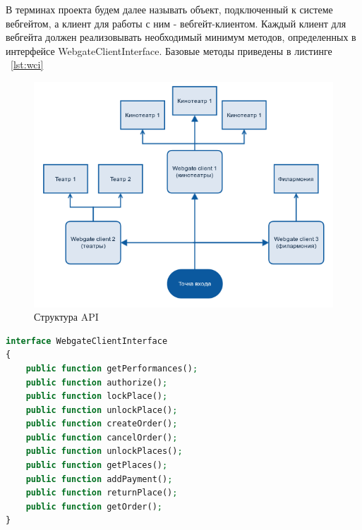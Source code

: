 В терминах проекта будем далее называть объект, подключенный к системе вебгейтом, а клиент для работы с ним - вебгейт-клиентом. Каждый клиент для вебгейта должен реализовывать необходимый минимум методов, определенных в интерфейсе WebgateClientInterface. Базовые методы приведены в листинге ~\ref{lst:wci}

\begin{figure}
  	\centering
 	\includegraphics[width=1\textwidth]{images/api-struct.png}
  	\caption{Структура API}
    \label{fig:api-struct}
\end{figure}

\begin{lstlisting}[language=PHP,caption={WebgateCleintInterface}label=lst:wci]
interface WebgateClientInterface
{
	public function getPerformances();
	public function authorize();
	public function lockPlace();
	public function unlockPlace();
	public function createOrder();
	public function cancelOrder();
	public function unlockPlaces();
	public function getPlaces();
	public function addPayment();
	public function returnPlace();
	public function getOrder();
}
\end{lstlisting}




